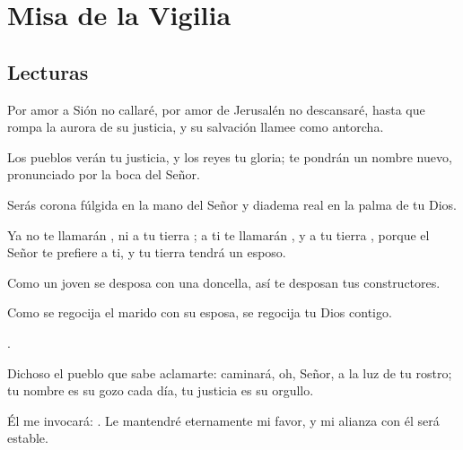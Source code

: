 \chapter{Misa de la Vigilia}

\section{Lecturas}


 


\begin{scripture}
\begin{readprose}
	Por amor a Sión no callaré,	
	por amor de Jerusalén no descansaré,	
	hasta que rompa la aurora de su justicia,	
	y su salvación llamee como antorcha.
	
	Los pueblos verán tu justicia,	
	y los reyes tu gloria;	
	te pondrán un nombre nuevo,	
	pronunciado por la boca del Señor.
	
	Serás corona fúlgida en la mano del Señor
	y diadema real en la palma de tu Dios.
	
	Ya no te llamarán ,
	ni a tu tierra ;
	a ti te llamarán ,
	y a tu tierra ,
	porque el Señor te prefiere a ti,	
	y tu tierra tendrá un esposo.
	
	Como un joven se desposa con una doncella,	
	así te desposan tus constructores.
	
	Como se regocija el marido con su esposa, 
	se regocija tu Dios contigo.
\end{readprose}
\end{scripture}



 


\begin{psbody}
	. 
	
	Dichoso el pueblo que sabe aclamarte:
	caminará, oh, Señor, a la luz de tu rostro;
	tu nombre es su gozo cada día,
	tu justicia es su orgullo.
	
	Él me invocará: .
	Le mantendré eternamente mi favor,
	y mi alianza con él será estable.
\end{psbody}



